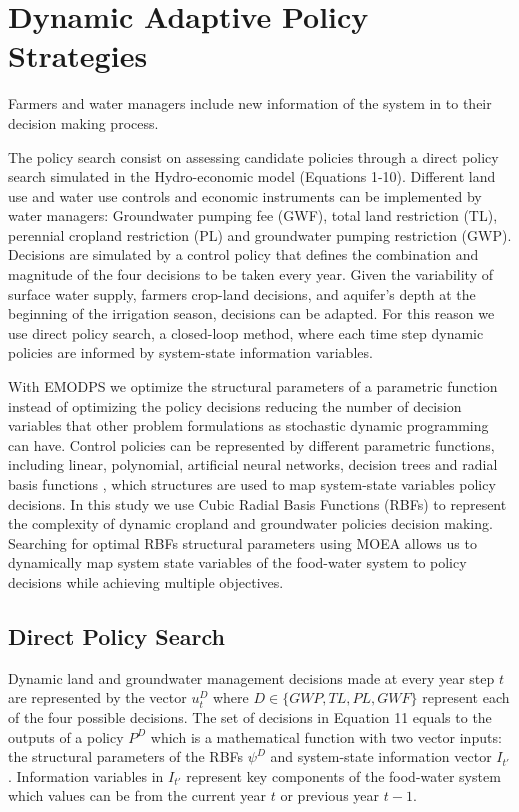 \documentclass[11pt,a4paper]{article}
\begin{document}
\section{Dynamic Adaptive Policy Strategies}

Farmers and water managers include new information of the system in to their decision making process.

The policy search consist on assessing candidate policies through a direct policy search simulated in the Hydro-economic model (Equations 1-10). Different land use and water use controls and economic instruments can be implemented by water managers: Groundwater pumping fee (GWF), total land restriction (TL), perennial cropland restriction (PL) and groundwater pumping restriction (GWP). Decisions are simulated by a control policy that defines the combination and magnitude of the four decisions to be taken every year. Given the variability of surface water supply, farmers crop-land decisions, and aquifer's depth at the beginning of the irrigation season, decisions can be adapted. For this reason we use direct policy search, a closed-loop method, where each time step dynamic policies are informed by system-state information variables. 

With EMODPS we optimize the structural parameters of a parametric function instead of optimizing the policy decisions reducing the number of decision variables that other problem formulations as stochastic dynamic programming can have. Control policies can be represented by different  parametric functions, including linear, polynomial, artificial neural networks, decision trees and radial basis functions \cite{giuliani_universal_2014}, which structures are used to map system-state variables policy decisions. In this study we use Cubic Radial Basis Functions (RBFs) to represent the complexity of dynamic cropland and groundwater policies decision making. Searching for optimal RBFs structural parameters using MOEA allows us to dynamically map system state variables of the food-water system to policy decisions while achieving multiple objectives.

\subsection{Direct Policy Search}

Dynamic land and groundwater management decisions made at every year step $t$ are represented by the vector $u_{t}^D$ where $D \in \{GWP,TL,PL,GWF\}$ represent each of the four possible decisions. The set of decisions in Equation 11 equals to the outputs of a policy $P^D$ which is a mathematical function with two vector inputs: the structural parameters of the RBFs $\psi^D$ and system-state information vector $I_{t'}$. Information variables in $I_{t'}$ represent key components of the food-water system which values can be from the current year $t$ or previous year $t-1$. 
\end{document}

